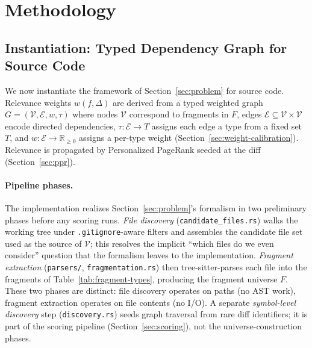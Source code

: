 \documentclass[11pt, a4paper]{article}
\begin{document}
\newpage
\section{Methodology}

\subsection{Instantiation: Typed Dependency Graph for Source Code}
\label{sec:tdg}

We now instantiate the framework of Section~\ref{sec:problem} for source code. Relevance weights $w(f, \Delta)$ are derived from a typed weighted graph $G = (\mathcal{V}, \mathcal{E}, w, \tau)$ where nodes $\mathcal{V}$ correspond to fragments in $F$, edges $\mathcal{E} \subseteq \mathcal{V} \times \mathcal{V}$ encode directed dependencies, $\tau : \mathcal{E} \to T$ assigns each edge a type from a fixed set $T$, and $w : \mathcal{E} \to \mathbb{R}_{\geq 0}$ assigns a per-type weight (Section~\ref{sec:weight-calibration}). Relevance is propagated by Personalized PageRank seeded at the diff (Section~\ref{sec:ppr}).

\paragraph{Pipeline phases.} The implementation realizes Section~\ref{sec:problem}'s formalism in two preliminary phases before any scoring runs. \emph{File discovery} (\texttt{candidate\_files.rs}) walks the working tree under \texttt{.gitignore}-aware filters and assembles the candidate file set used as the source of $\mathcal{V}$; this resolves the implicit ``which files do we even consider'' question that the formalism leaves to the implementation. \emph{Fragment extraction} (\texttt{parsers/}, \texttt{fragmentation.rs}) then tree-sitter-parses each file into the fragments of Table~\ref{tab:fragment-types}, producing the fragment universe $F$. These two phases are distinct: file discovery operates on paths (no AST work), fragment extraction operates on file contents (no I/O). A separate \emph{symbol-level discovery} step (\texttt{discovery.rs}) seeds graph traversal from rare diff identifiers; it is part of the scoring pipeline (Section~\ref{sec:scoring}), not the universe-construction phases.
\end{document}
